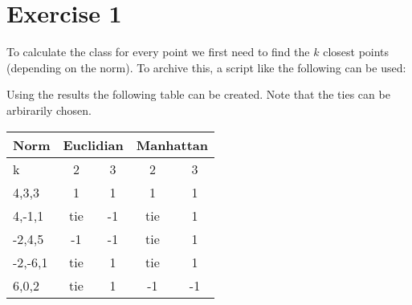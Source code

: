 \section*{Exercise 1}
To calculate the class for every point we first need to find the $k$ closest points (depending on the norm).
To archive this, a script like the following can be used:

Using the results the following table can be created. Note that the ties can be arbirarily chosen.


  \centering \begin{tabular}{l|c|c|c|c}
    Norm&\multicolumn{2}{c}{Euclidian}&\multicolumn{2}{c}{Manhattan}\\\hline
    k&2&3&2&3\\\hline
    4,3,3&1&1&1&1\\
    4,-1,1&tie&-1&tie&1\\
    -2,4,5&-1&-1&tie&1\\
    -2,-6,1&tie&1&tie&1\\
    6,0,2&tie&1&-1&-1
  \end{tabular}

\flushleft